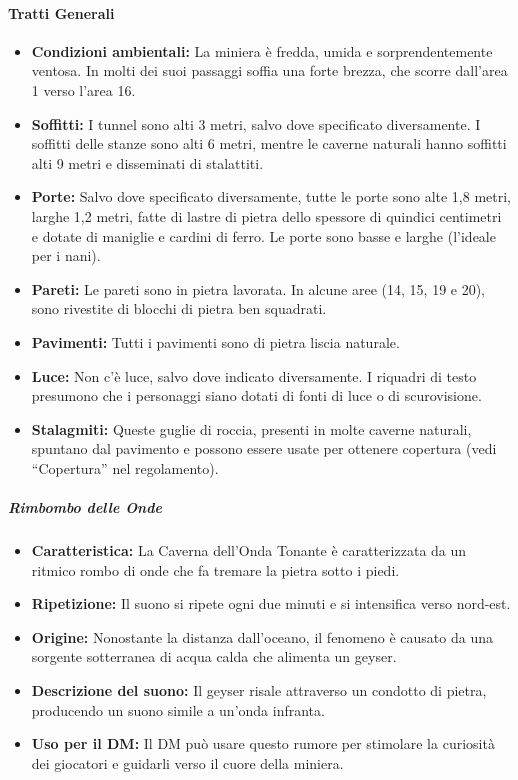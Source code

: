 \documentclass{article}
\begin{document}
    \paragraph*{ Tratti Generali}
    \begin{itemize}
        \item \textbf{Condizioni ambientali:} La miniera è fredda, umida e sorprendentemente ventosa. In molti dei suoi passaggi soffia una forte brezza, che scorre dall’area 1 verso l'area 16.
        \item \textbf{Soffitti:} I tunnel sono alti 3 metri, salvo dove specificato diversamente. I soffitti delle stanze sono alti 6 metri, mentre le caverne naturali hanno soffitti alti 9 metri e disseminati di stalattiti.
        \item \textbf{Porte:} Salvo dove specificato diversamente, tutte le porte sono alte 1,8 metri, larghe 1,2 metri, fatte di lastre di pietra dello spessore di quindici centimetri e dotate di maniglie e cardini di ferro. Le porte sono basse e larghe (l'ideale per i nani).
        \item \textbf{Pareti:} Le pareti sono in pietra lavorata. In alcune aree (14, 15, 19 e 20), sono rivestite di blocchi di pietra ben squadrati.
        \item \textbf{Pavimenti:} Tutti i pavimenti sono di pietra liscia naturale.
        \item \textbf{Luce:} Non c'è luce, salvo dove indicato diversamente. I riquadri di testo presumono che i personaggi siano dotati di fonti di luce o di scurovisione.
        \item \textbf{Stalagmiti:} Queste guglie di roccia, presenti in molte caverne naturali, spuntano dal pavimento e possono essere usate per ottenere copertura (vedi “Copertura” nel regolamento).
    \end{itemize}
    
    \subparagraph*{Rimbombo delle Onde}

        \begin{itemize}
            \item \textbf{Caratteristica:} La Caverna dell’Onda Tonante è caratterizzata da un ritmico rombo di onde che fa tremare la pietra sotto i piedi.
            \item \textbf{Ripetizione:} Il suono si ripete ogni due minuti e si intensifica verso nord-est.
            \item \textbf{Origine:} Nonostante la distanza dall’oceano, il fenomeno è causato da una sorgente sotterranea di acqua calda che alimenta un geyser.
            \item \textbf{Descrizione del suono:} Il geyser risale attraverso un condotto di pietra, producendo un suono simile a un’onda infranta.
            \item \textbf{Uso per il DM:} Il DM può usare questo rumore per stimolare la curiosità dei giocatori e guidarli verso il cuore della miniera.
        \end{itemize}
\end{document}
